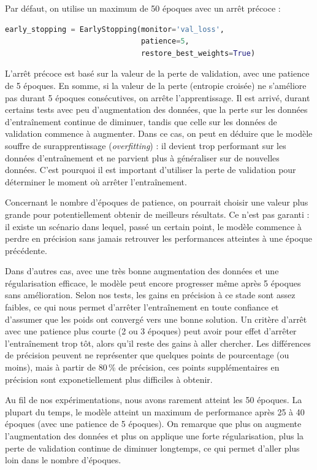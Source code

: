 \documentclass{article}
\begin{document}
Par défaut, on utilise un maximum de 50 époques avec un arrêt précoce :
\begin{lstlisting}[language=Python]
early_stopping = EarlyStopping(monitor='val_loss',
                               patience=5,
                               restore_best_weights=True)
\end{lstlisting}

L'arrêt précoce est basé sur la valeur de la perte de validation, avec une patience de 5 époques. En somme, si la valeur de la perte (entropie croisée) ne s’améliore pas durant 5 époques consécutives, on arrête l’apprentissage. Il est arrivé, durant certains tests avec peu d’augmentation des données, que la perte sur les données d’entraînement continue de diminuer, tandis que celle sur les données de validation commence à augmenter. Dans ce cas, on peut en déduire que le modèle souffre de surapprentissage (\emph{overfitting}) : il devient trop performant sur les données d’entraînement et ne parvient plus à généraliser sur de nouvelles données. C’est pourquoi il est important d’utiliser la perte de validation pour déterminer le moment où arrêter l'entraînement. 

Concernant le nombre d’époques de patience, on pourrait choisir une valeur plus grande pour potentiellement obtenir de meilleurs résultats. Ce n’est pas garanti : il existe un scénario dans lequel, passé un certain point, le modèle commence à perdre en précision sans jamais retrouver les performances atteintes à une époque précédente.

Dans d'autres cas, avec une très bonne augmentation des données et une régularisation efficace, le modèle peut encore progresser même après 5 époques sans amélioration. Selon nos tests, les gains en précision à ce stade sont assez faibles, ce qui nous permet d’arrêter l’entraînement en toute confiance et d’assumer que les poids ont convergé vers une bonne solution. Un critère d’arrêt avec une patience plus courte (2 ou 3 époques) peut avoir pour effet d’arrêter l’entraînement trop tôt, alors qu’il reste des gains à aller chercher. Les différences de précision peuvent ne représenter que quelques points de pourcentage (ou moins), mais à partir de 80\,\% de précision, ces points supplémentaires en précision sont exponetiellement plus difficiles à obtenir.

Au fil de nos expérimentations, nous avons rarement atteint les 50 époques. La plupart du temps, le modèle atteint un maximum de performance après 25 à 40 époques (avec une patience de 5 époques). On remarque que plus on augmente l’augmentation des données et plus on applique une forte régularisation, plus la perte de validation continue de diminuer longtemps, ce qui permet d'aller plus loin dans le nombre d’époques.
\end{document}
